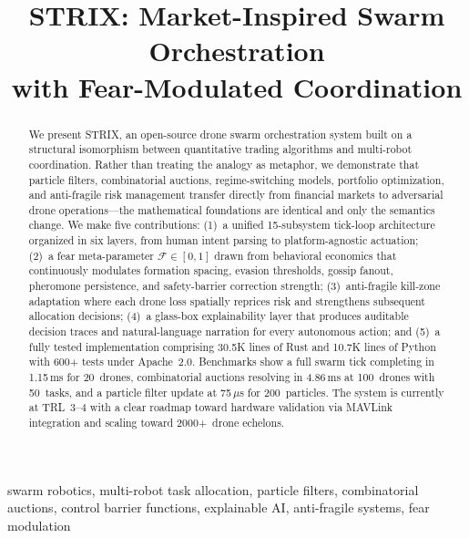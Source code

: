 \documentclass[conference]{IEEEtran}
\newcommand{\fear}{\mathcal{F}}
\begin{document}
\title{STRIX: Market-Inspired Swarm Orchestration\\with Fear-Modulated Coordination}

\author{
}

\maketitle

\begin{abstract}
We present STRIX, an open-source drone swarm orchestration system
built on a structural isomorphism between quantitative trading algorithms
and multi-robot coordination. Rather than treating the analogy as metaphor,
we demonstrate that particle filters, combinatorial auctions, regime-switching
models, portfolio optimization, and anti-fragile risk management transfer
directly from financial markets to adversarial drone operations---the
mathematical foundations are identical and only the semantics change.
We make five contributions:
(1)~a unified 15-subsystem tick-loop architecture organized in six
layers, from human intent parsing to platform-agnostic actuation;
(2)~a fear meta-parameter $\fear\in[0,1]$ drawn from behavioral economics
that continuously modulates formation spacing, evasion thresholds, gossip
fanout, pheromone persistence, and safety-barrier correction strength;
(3)~anti-fragile kill-zone adaptation where each drone loss spatially
reprices risk and strengthens subsequent allocation decisions;
(4)~a glass-box explainability layer that produces auditable decision
traces and natural-language narration for every autonomous action; and
(5)~a fully tested implementation comprising 30.5K lines of Rust and
10.7K lines of Python with 600{+} tests under Apache~2.0.
Benchmarks show a full swarm tick completing in 1.15\,ms for 20~drones,
combinatorial auctions resolving in 4.86\,ms at 100~drones with 50~tasks,
and a particle filter update at 75\,$\mu$s for 200~particles.
The system is currently at TRL~3--4 with a clear roadmap toward
hardware validation via MAVLink integration and scaling toward
2000{+}~drone echelons.
\end{abstract}

\begin{IEEEkeywords}
swarm robotics, multi-robot task allocation, particle filters,
combinatorial auctions, control barrier functions, explainable AI,
anti-fragile systems, fear modulation
\end{IEEEkeywords}
\end{document}
